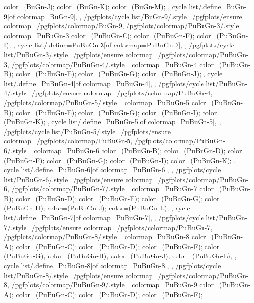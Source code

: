 {{{      color=(BuGn-J);
      color=(BuGn-K);
      color=(BuGn-M);
    },
    cycle list/.define={BuGn-9}{[of colormap=BuGn-9]},
  },
  /pgfplots/cycle list/BuGn-9/.style={/pgfplots/ensure colormap={/pgfplots/colormap/BuGn-9}},
  /pgfplots/colormap/PuBuGn-3/.style={
    colormap={PuBuGn-3}{
      color=(PuBuGn-C);
      color=(PuBuGn-F);
      color=(PuBuGn-I);
    },
    cycle list/.define={PuBuGn-3}{[of colormap=PuBuGn-3]},
  },
  /pgfplots/cycle list/PuBuGn-3/.style={/pgfplots/ensure colormap={/pgfplots/colormap/PuBuGn-3}},
  /pgfplots/colormap/PuBuGn-4/.style={
    colormap={PuBuGn-4}{
      color=(PuBuGn-B);
      color=(PuBuGn-E);
      color=(PuBuGn-G);
      color=(PuBuGn-J);
    },
    cycle list/.define={PuBuGn-4}{[of colormap=PuBuGn-4]},
  },
  /pgfplots/cycle list/PuBuGn-4/.style={/pgfplots/ensure colormap={/pgfplots/colormap/PuBuGn-4}},
  /pgfplots/colormap/PuBuGn-5/.style={
    colormap={PuBuGn-5}{
      color=(PuBuGn-B);
      color=(PuBuGn-E);
      color=(PuBuGn-G);
      color=(PuBuGn-I);
      color=(PuBuGn-K);
    },
    cycle list/.define={PuBuGn-5}{[of colormap=PuBuGn-5]},
  },
  /pgfplots/cycle list/PuBuGn-5/.style={/pgfplots/ensure colormap={/pgfplots/colormap/PuBuGn-5}},
  /pgfplots/colormap/PuBuGn-6/.style={
    colormap={PuBuGn-6}{
      color=(PuBuGn-B);
      color=(PuBuGn-D);
      color=(PuBuGn-F);
      color=(PuBuGn-G);
      color=(PuBuGn-I);
      color=(PuBuGn-K);
    },
    cycle list/.define={PuBuGn-6}{[of colormap=PuBuGn-6]},
  },
  /pgfplots/cycle list/PuBuGn-6/.style={/pgfplots/ensure colormap={/pgfplots/colormap/PuBuGn-6}},
  /pgfplots/colormap/PuBuGn-7/.style={
    colormap={PuBuGn-7}{
      color=(PuBuGn-B);
      color=(PuBuGn-D);
      color=(PuBuGn-F);
      color=(PuBuGn-G);
      color=(PuBuGn-H);
      color=(PuBuGn-J);
      color=(PuBuGn-L);
    },
    cycle list/.define={PuBuGn-7}{[of colormap=PuBuGn-7]},
  },
  /pgfplots/cycle list/PuBuGn-7/.style={/pgfplots/ensure colormap={/pgfplots/colormap/PuBuGn-7}},
  /pgfplots/colormap/PuBuGn-8/.style={
    colormap={PuBuGn-8}{
      color=(PuBuGn-A);
      color=(PuBuGn-C);
      color=(PuBuGn-D);
      color=(PuBuGn-F);
      color=(PuBuGn-G);
      color=(PuBuGn-H);
      color=(PuBuGn-J);
      color=(PuBuGn-L);
    },
    cycle list/.define={PuBuGn-8}{[of colormap=PuBuGn-8]},
  },
  /pgfplots/cycle list/PuBuGn-8/.style={/pgfplots/ensure colormap={/pgfplots/colormap/PuBuGn-8}},
  /pgfplots/colormap/PuBuGn-9/.style={
    colormap={PuBuGn-9}{
      color=(PuBuGn-A);
      color=(PuBuGn-C);
      color=(PuBuGn-D);
      color=(PuBuGn-F);
}}}
